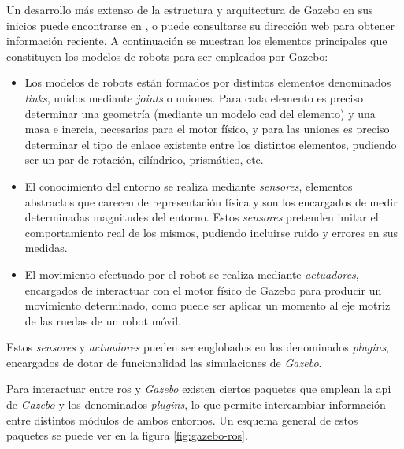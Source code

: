 Un desarrollo más extenso de la estructura y arquitectura de Gazebo en sus inicios puede encontrarse en \cite{koenig2004design}, o puede consultarse su dirección web \cite{website:gazebo} para obtener información reciente. A continuación se muestran los elementos principales que constituyen los modelos de robots para ser empleados por Gazebo:

\begin{itemize}

\item Los modelos de robots están formados por distintos elementos denominados \emph{links}, unidos mediante \emph{joints} o uniones. Para cada elemento es preciso determinar una geometría (mediante un modelo \acrshort{cad} del elemento) y una masa e inercia, necesarias para el motor físico, y para las uniones es preciso determinar el tipo de enlace existente entre los distintos elementos, pudiendo ser un par de rotación, cilíndrico, prismático, etc. \par 

\item El conocimiento del entorno se realiza mediante \emph{sensores}, elementos abstractos que carecen de representación física y son los encargados de medir determinadas magnitudes del entorno. Estos \emph{sensores} pretenden imitar el comportamiento real de los mismos, pudiendo incluirse ruido y errores en sus medidas. \par 

\item El movimiento efectuado por el robot se realiza mediante \emph{actuadores}, encargados de interactuar con el motor físico de Gazebo para producir un movimiento determinado, como puede ser aplicar un momento al eje motriz de las ruedas de un robot móvil. \par 

\end{itemize}

Estos \emph{sensores} y \emph{actuadores} pueden ser englobados en los denominados \emph{plugins}, encargados de dotar de funcionalidad las simulaciones de \emph{Gazebo}. 

Para interactuar entre \acrshort{ros} y \emph{Gazebo} existen ciertos paquetes que emplean la \acrshort{api} de \emph{Gazebo} y los denominados \textit{plugins}, lo que permite intercambiar información entre distintos módulos de ambos entornos. Un esquema general de estos paquetes se puede ver en la figura \ref{fig:gazebo-ros}.\par 

